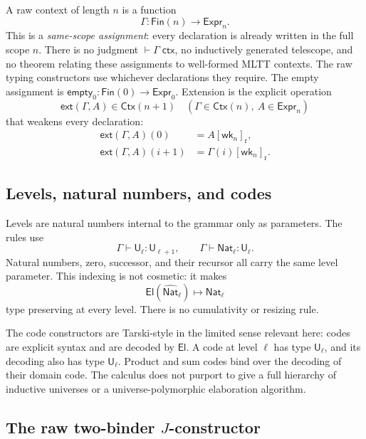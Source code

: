 \documentclass[10pt,reqno]{amsart}
\newcommand{\Fin}{\mathsf{Fin}}
\newcommand{\Expr}{\mathsf{Expr}}
\newcommand{\Ctx}{\mathsf{Ctx}}
\newcommand{\Ext}[2]{\mathsf{ext}(#1,#2)}
\newcommand{\EmptyCtx}{\mathsf{empty}}
\newcommand{\Sort}{\mathsf{U}}
\newcommand{\NatTy}{\mathsf{Nat}}
\newcommand{\CodeNat}{\widehat{\mathsf{Nat}}}
\newcommand{\El}{\mathsf{El}}
\newcommand{\red}{\mathrel{\longmapsto}}
\newcommand{\wk}{\mathsf{wk}}
\begin{document}
A raw context of length \(n\) is a function
\[
                       \Gamma:\Fin(n)\longrightarrow\Expr_n.
\]
This is a \emph{same-scope assignment}: every declaration is already written
in the full scope \(n\).  There is no judgment
\(\vdash\Gamma\;\mathsf{ctx}\), no inductively generated telescope, and no
theorem relating these assignments to well-formed MLTT contexts.  The raw
typing constructors use whichever declarations they require.  The empty
assignment is
\(\EmptyCtx_0:\Fin(0)\to\Expr_0\).  Extension is the explicit operation
\[
 \Ext{\Gamma}{A}\in\Ctx(n+1)
 \quad(\Gamma\in\Ctx(n),\ A\in\Expr_n)
\]
that weakens every declaration:
\[
\begin{split}
\Ext{\Gamma}{A}(0)&=A[\wk_n]_{\mathrm r},\\
\Ext{\Gamma}{A}(i+1)&=\Gamma(i)[\wk_n]_{\mathrm r}.
\end{split}
\tag{3.1}\label{eq:context-extension}
\]

\subsection{Levels, natural numbers, and codes}

Levels are natural numbers internal to the grammar only as parameters.
The rules use
\[
              \Gamma\vdash\Sort_\ell:\Sort_{\ell+1},
   \qquad
              \Gamma\vdash\NatTy_\ell:\Sort_\ell.
\]
Natural numbers, zero, successor, and their recursor all carry the same
level parameter.  This indexing is not cosmetic: it makes
\[
                 \El(\CodeNat_\ell)\red\NatTy_\ell
\]
type preserving at every level.  There is no cumulativity or resizing rule.

The code constructors are Tarski-style in the limited sense relevant here:
codes are explicit syntax and are decoded by \(\El\).  A code at level
\(\ell\) has type \(\Sort_\ell\), and its decoding also has type
\(\Sort_\ell\).  Product and sum codes bind over the decoding of their domain
code.  The calculus does not purport to give a full hierarchy of inductive
universes or a universe-polymorphic elaboration algorithm.

\subsection{\texorpdfstring{The raw two-binder \(J\)-constructor}
{The raw two-binder J-constructor}}
\end{document}
